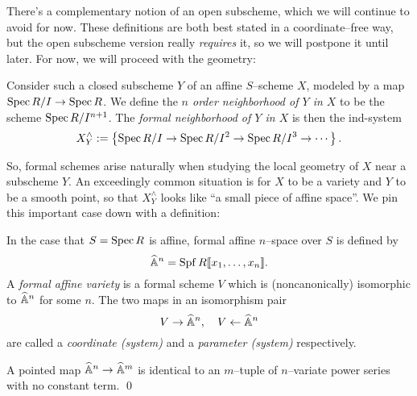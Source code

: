 There's a complementary notion of an open subscheme, which we will continue to avoid for now.  These definitions are both best stated in a coordinate--free way, but the open subscheme version really \emph{requires} it, so we will postpone it until later.  For now, we will proceed with the geometry:

\begin{definition}
Consider such a closed subscheme $Y$ of an affine $S$--scheme $X$, modeled by a map $\operatorname{Spec} R/I \to \operatorname{Spec} R$.  We define the \textit{$n${\th} order neighborhood of $Y$ in $X$} to be the scheme $\operatorname{Spec} R/I^{n+1}$.  The \textit{formal neighborhood of $Y$ in $X$} is then the ind-system \[X^\wedge_Y := \left\{ \operatorname{Spec} R/I \to \operatorname{Spec} R/I^2 \to \operatorname{Spec} R/I^3 \to \cdots \right\}.\]
\end{definition}

\noindent So, formal schemes arise naturally when studying the local geometry of $X$ near a subscheme $Y$.  An exceedingly common situation is for $X$ to be a variety and $Y$ to be a smooth point, so that $X^\wedge_Y$ looks like ``a small piece of affine space''.  We pin this important case down with a definition:

\begin{definition}
In the case that $S = \operatorname{Spec} R$ is affine, formal affine $n$--space over $S$ is defined by \[\widehat{\mathbb{A}}^n = \operatorname{Spf} R\llbracket x_1, \ldots, x_n\rrbracket.\]   A \textit{formal affine variety} is a formal scheme $V$ which is (noncanonically) isomorphic to $\widehat{\mathbb{A}}^n$ for some $n$.  The two maps in an isomorphism pair \[V \to \widehat{\mathbb{A}}^n, \quad V \leftarrow \widehat{\mathbb{A}}^n\] are called a \textit{coordinate (system)} and a \textit{parameter (system)} respectively.
\end{definition}

\begin{lemma}\label{MapsOfFVarsArePowerSeries}
A pointed map $\widehat{\mathbb{A}}^n \to \widehat{\mathbb{A}}^m$ is identical to an $m$--tuple of $n$--variate power series with no constant term. \qed
\end{lemma}

